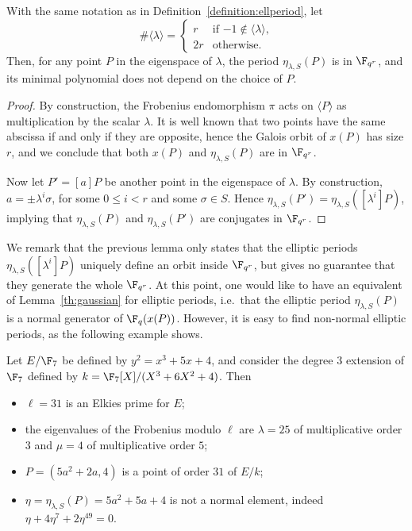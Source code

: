 \begin{lemma}
  \label{lemma:ellperiods-order}
  With the same notation as in Definition~\ref{definition:ellperiod},
  let
  \begin{equation*}
    \#\langle\lambda\rangle =
    \begin{cases}
      r & \text{if $-1\notin\langle\lambda\rangle$,}\\
      2r & \text{otherwise.}
    \end{cases}
  \end{equation*}
  Then, for any point $P$ in the eigenspace of $\lambda$, the period
  $\eta_{\lambda,S}(P)$ is in $\F_{q^r}$, and its minimal polynomial
  does not depend on the choice of $P$.
\end{lemma}
\begin{proof}
  By construction, the Frobenius endomorphism $\pi$ acts on
  $\langle P\rangle$ as multiplication by the scalar $\lambda$. It is
  well known that two points have the same abscissa if and only if
  they are opposite, hence the Galois orbit of $x(P)$ has size $r$,
  and we conclude that both $x(P)$ and $\eta_{\lambda,S}(P)$ are in
  $\F_{q^r}$.

  Now let $P'=[a]P$ be another point in the eigenspace of
  $\lambda$. By construction, $a=\pm \lambda^i\sigma$, for some
  $0\le i<r$ and some $\sigma\in S$. Hence
  $\eta_{\lambda,S}(P')=\eta_{\lambda,S}([\lambda^i]P)$, implying that
  $\eta_{\lambda,S}(P)$ and $\eta_{\lambda,S}(P')$ are conjugates in
  $\F_{q^r}$.
\end{proof}

We remark that the previous lemma only states that the elliptic
periods $\eta_{\lambda,S}([\lambda^i]P)$ uniquely define an orbit
inside $\F_{q^r}$, but gives no guarantee that they generate the whole
$\F_{q^r}$. %
At this point, one would like to have an equivalent of
Lemma~\ref{th:gaussian} for elliptic periods, i.e.\ that the elliptic
period $\eta_{\lambda,S}(P)$ is a normal generator of $\F_q(x(P))$.
However, it is easy to find non-normal elliptic periods, as the
following example shows.

\begin{example}
\label{ex:non-normal}
  Let $E/\F_7$ be defined by $y^2 = x^3 + 5 x + 4$, and consider the
  degree $3$ extension of $\F_7$ defined by
  $k=\F_7[X]/(X^3 + 6 X^2 + 4)$. Then
  \begin{itemize}
  \item $\ell = 31$ is an Elkies prime for $E$;
  \item the eigenvalues of the Frobenius modulo $\ell$ are
    $\lambda = 25$ of multiplicative order $3$ and $\mu = 4$ of
    multiplicative order $5$;
  \item $P = (5 a^2+2 a, 4)$ is a point of order $31$ of $E/k$;
  \item $\eta=\eta_{\lambda,S}(P) = 5 a^2 + 5 a + 4$ is not a normal
    element, indeed
    $\eta + 4 \eta^7 + 2 \eta^{49} = 0$.
  \end{itemize}
\end{example}

